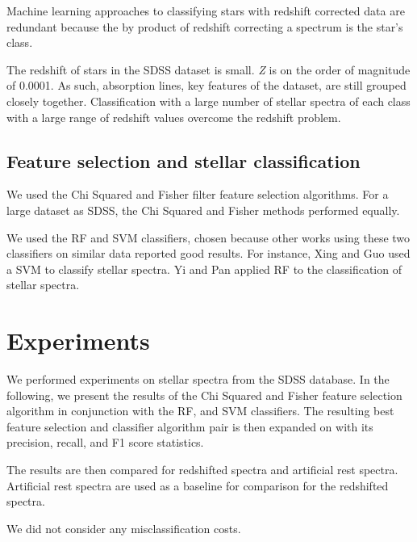 \documentclass[conference]{IEEEtran}
\begin{document}
	Machine learning approaches to classifying stars with redshift corrected data are redundant because the by product of redshift correcting a spectrum is the star's class.

	The redshift of stars in the SDSS dataset is small. \textit{Z} is on the order of magnitude of 0.0001. As such, absorption lines, key features of the dataset, are still grouped closely together. Classification with a large number of stellar spectra of each class with a large range of redshift values overcome the redshift problem.    

	\subsection{Feature selection and stellar classification}\label{sec:alg}

We used the Chi Squared \cite{scikit-learn} and Fisher \cite{reliefF} filter feature selection algorithms. For a large dataset as SDSS, the Chi Squared and Fisher methods performed equally.

We used the RF and SVM classifiers, chosen because other works using these two classifiers on similar data reported good results.  For instance, Xing and Guo \cite{Xing} used a SVM to classify stellar spectra. Yi and Pan \cite{YI} applied RF to the classification of stellar spectra. 


\section{Experiments}\label{sec:experiments}

We performed experiments on stellar spectra from the SDSS database. In the following, we present the results of the Chi Squared and Fisher feature selection algorithm in conjunction with the RF, and SVM classifiers. The resulting best feature selection and classifier algorithm pair is then expanded on with its precision, recall, and F1 score statistics.

The results are then compared for redshifted spectra and artificial rest spectra. Artificial rest spectra are used as a baseline for comparison for the redshifted spectra. 

We did not consider any misclassification costs.
\end{document}
